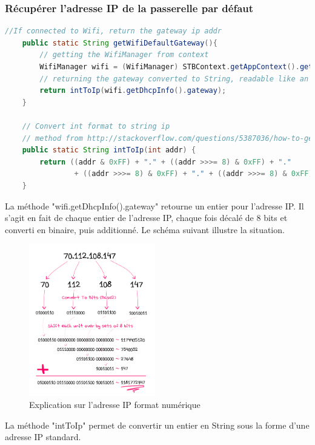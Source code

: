\subsubsection{Récupérer l'adresse IP de la passerelle par défaut}
\begin{lstlisting}[language=Java, caption={Code de récupération de la paserelle par défaut}]
//If connected to Wifi, return the gateway ip addr
	public static String getWifiDefaultGateway(){
		// getting the WifiManager from context
		WifiManager wifi = (WifiManager) STBContext.getAppContext().getSystemService(Context.WIFI_SERVICE);
		// returning the gateway converted to String, readable like an ip address
		return intToIp(wifi.getDhcpInfo().gateway);
	}
	
	// Convert int format to string ip
	// method from http://stackoverflow.com/questions/5387036/how-to-get-gateway-and-subnet-mask-details-in-android-programmatically
	public static String intToIp(int addr) {
		return ((addr & 0xFF) + "." + ((addr >>>= 8) & 0xFF) + "."
				+ ((addr >>>= 8) & 0xFF) + "." + ((addr >>>= 8) & 0xFF));
	}
\end{lstlisting}

\medskip

La méthode "wifi.getDhcpInfo().gateway" retourne un entier pour l'adresse IP. Il s'agit en fait de chaque entier de l'adresse IP, chaque fois décalé de 8 bits et converti en binaire, puis additionné. Le schéma suivant illustre la situation.
\begin{figure}[H]
      \centering
      \includegraphics[height=250px]{00_media/intToIp}
      \caption{Explication sur l'adresse IP format numérique}
      \label{gra:maqmenu}
\end{figure}

La méthode "intToIp" permet de convertir un entier en String sous la forme d'une adresse IP standard.

